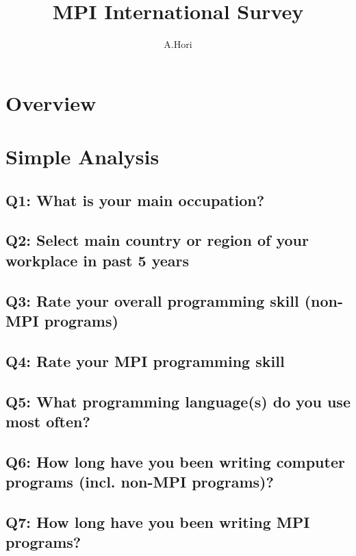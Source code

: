 \documentclass{report}
\title{MPI International Survey}
\author{A.Hori}
\begin{document}
\maketitle

\chapter{Overview}


\chapter{Simple Analysis}
\section{Q1: What is your main occupation?}


\clearpage
\section{Q2: Select main country or region of your workplace in past 5 years}


\clearpage
\section{Q3: Rate your overall programming skill (non-MPI programs)}


\clearpage
\section{Q4: Rate your MPI programming skill}


\clearpage
\section{Q5: What programming language(s) do you use most often?}


\clearpage
\section{Q6: How long have you been writing computer programs (incl. non-MPI programs)?}


\clearpage
\section{Q7: How long have you been writing MPI programs?}

\end{document}
